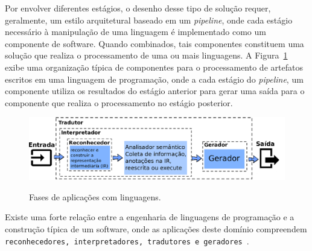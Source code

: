Por envolver diferentes est\'{a}gios, o desenho desse tipo de solu\c c\~{a}o requer, geralmente, 
um estilo arquitetural baseado em um \emph{pipeline},  onde cada est\'{a}gio necess\'{a}rio \`{a}  
 manipulaç\~{a}o de uma linguagem \'{e} implementado como um componente de software. Quando combinados, 
tais componentes constituem uma solu\c c\~{a}o que realiza o processamento 
de uma ou mais linguagens. A Figura~\ref{fig:stagesLanguageApp} exibe uma organiza\c c\~{a}o 
t\'{i}pica de componentes para o processamento de artefatos escritos em uma linguagem de 
programa\c c\~{a}o, onde a cada est\'{a}gio do \emph{pipeline}, um componente 
utiliza os resultados do est\'{a}gio anterior para gerar uma sa\'{i}da para o componente 
que realiza o processamento no est\'{a}gio posterior.  

\begin{figure}[h]
  \center
  \includegraphics[scale=0.9]{Imagens/stagesLanguageApp}
  \label{fig:stagesLanguageApp}
  \caption{Fases de aplicaç\~{o}es com linguagens.}
\end{figure}

Existe uma forte relação entre a engenharia de linguagens de programação e a construção típica de um software, onde as aplicações deste domínio compreendem \texttt{reconhecedores, interpretadores, tradutores e geradores}~\cite{Parr:2009:LIP:1823613}. 

